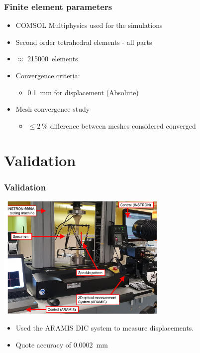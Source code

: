 \documentclass[aspectratio=169,xcolor={svgnames,table},10pt,fleqn]{beamer}
\begin{document}
  \begin{frame}
    \frametitle{Finite element parameters}
    \begin{itemize}
      \item COMSOL Multiphysics used for the simulations
      \item Second order tetrahedral elements - all parts
      \item $\approx$ \qty{215000}{elements}
      \item Convergence criteria:
        \begin{itemize}
          \item \qty{0.1}{\milli\meter} for displacement (Absolute)
        \end{itemize}
      \item Mesh convergence study
        \begin{itemize}
          \item $\le\qty{2}{\percent}$ difference between meshes considered converged 
        \end{itemize}
    \end{itemize}
  \end{frame}

\section{Validation}

  \begin{frame}
    \frametitle{Validation}
    \centering
    \includegraphics[height=6cm]{Figs/Validation}
    \begin{itemize}
      \item Used the ARAMIS DIC system to measure displacements.
      \item Quote accuracy of \qty{0.0002}{\milli\meter}
    \end{itemize}
  \end{frame}
\end{document}
